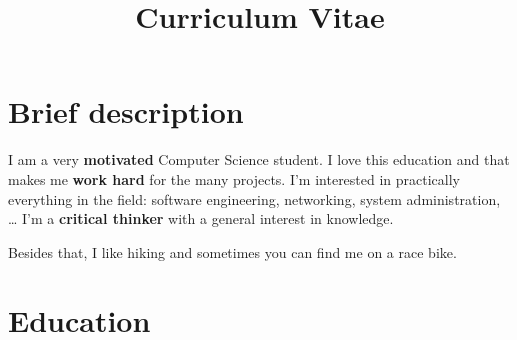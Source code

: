 \documentclass[11pt,a4paper,sans]{moderncv} %
\title{Curriculum Vitae}
\begin{document}




\makecvtitle %


\section{Brief description}
I am a very \textbf{motivated} Computer Science student.
I love this education and that makes me \textbf{work hard} for the many projects.
I'm interested in practically everything in the field: software engineering, networking, system administration, \dots \hspace{2pt}
I'm a \textbf{critical thinker} with a general interest in knowledge.

Besides that, I like hiking and sometimes you can find me on a race bike.


\section{Education}
\end{document}
